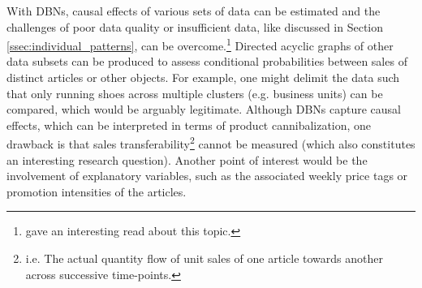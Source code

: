 With \acp{DBN}, causal effects of various sets of data can be estimated and the challenges of poor data quality or insufficient data, like discussed in Section \ref{ssec:individual_patterns}, can be overcome.\footnote{\cite{bn_advantages} gave an interesting read about this topic.} Directed acyclic graphs of other data subsets can be produced to assess conditional probabilities between sales of distinct articles or other objects. For example, one might delimit the data such that only running shoes across multiple clusters (e.g. business units) can be compared, which would be arguably legitimate. Although \acp{DBN} capture causal effects, which can be interpreted in terms of product cannibalization, one drawback is that sales transferability\footnote{i.e. The actual quantity flow of unit sales of one article towards another across successive time-points.} cannot be measured (which also constitutes an interesting research question). Another point of interest would be the involvement of explanatory variables, such as the associated weekly price tags or promotion intensities of the articles.

